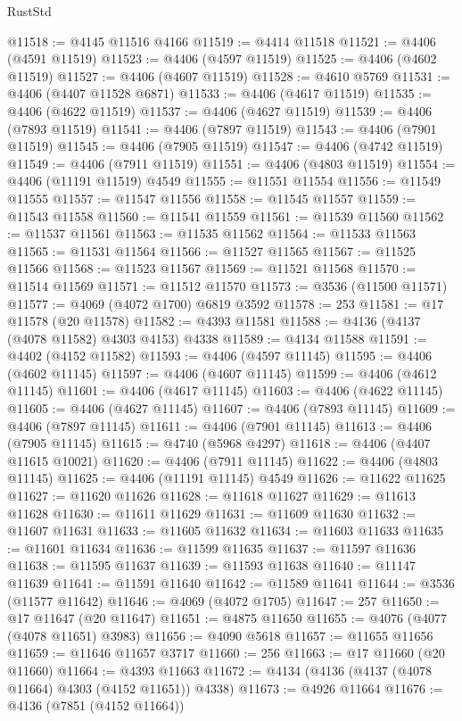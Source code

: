 \begin{lexlean}{RustStd}
\begin{coremodule}
{\begin{coremodule}
{{{{{{{{{{{{{{{{{{{{{{{{{{{{{{{{{{{{{{{{{{{{{{{{{{@11518 := @4145 @11516 @4166
@11519 := @4414 @11518
@11521 := @4406 (@4591 @11519)
@11523 := @4406 (@4597 @11519)
@11525 := @4406 (@4602 @11519)
@11527 := @4406 (@4607 @11519)
@11528 := @4610 @5769
@11531 := @4406 (@4407 @11528 @6871)
@11533 := @4406 (@4617 @11519)
@11535 := @4406 (@4622 @11519)
@11537 := @4406 (@4627 @11519)
@11539 := @4406 (@7893 @11519)
@11541 := @4406 (@7897 @11519)
@11543 := @4406 (@7901 @11519)
@11545 := @4406 (@7905 @11519)
@11547 := @4406 (@4742 @11519)
@11549 := @4406 (@7911 @11519)
@11551 := @4406 (@4803 @11519)
@11554 := @4406 (@11191 @11519) @4549
@11555 := @11551 @11554
@11556 := @11549 @11555
@11557 := @11547 @11556
@11558 := @11545 @11557
@11559 := @11543 @11558
@11560 := @11541 @11559
@11561 := @11539 @11560
@11562 := @11537 @11561
@11563 := @11535 @11562
@11564 := @11533 @11563
@11565 := @11531 @11564
@11566 := @11527 @11565
@11567 := @11525 @11566
@11568 := @11523 @11567
@11569 := @11521 @11568
@11570 := @11514 @11569
@11571 := @11512 @11570
@11573 := @3536 (@11500 @11571)
@11577 := @4069 (@4072 @1700) @6819 @3592
@11578 := 253
@11581 := @17 @11578 (@20 @11578)
@11582 := @4393 @11581
@11588 := @4136 (@4137 (@4078 @11582) @4303 @4153) @4338
@11589 := @4134 @11588
@11591 := @4402 (@4152 @11582)
@11593 := @4406 (@4597 @11145)
@11595 := @4406 (@4602 @11145)
@11597 := @4406 (@4607 @11145)
@11599 := @4406 (@4612 @11145)
@11601 := @4406 (@4617 @11145)
@11603 := @4406 (@4622 @11145)
@11605 := @4406 (@4627 @11145)
@11607 := @4406 (@7893 @11145)
@11609 := @4406 (@7897 @11145)
@11611 := @4406 (@7901 @11145)
@11613 := @4406 (@7905 @11145)
@11615 := @4740 (@5968 @4297)
@11618 := @4406 (@4407 @11615 @10021)
@11620 := @4406 (@7911 @11145)
@11622 := @4406 (@4803 @11145)
@11625 := @4406 (@11191 @11145) @4549
@11626 := @11622 @11625
@11627 := @11620 @11626
@11628 := @11618 @11627
@11629 := @11613 @11628
@11630 := @11611 @11629
@11631 := @11609 @11630
@11632 := @11607 @11631
@11633 := @11605 @11632
@11634 := @11603 @11633
@11635 := @11601 @11634
@11636 := @11599 @11635
@11637 := @11597 @11636
@11638 := @11595 @11637
@11639 := @11593 @11638
@11640 := @11147 @11639
@11641 := @11591 @11640
@11642 := @11589 @11641
@11644 := @3536 (@11577 @11642)
@11646 := @4069 (@4072 @1705)
@11647 := 257
@11650 := @17 @11647 (@20 @11647)
@11651 := @4875 @11650
@11655 := @4076 (@4077 (@4078 @11651) @3983)
@11656 := @4090 @5618
@11657 := @11655 @11656
@11659 := @11646 @11657 @3717
@11660 := 256
@11663 := @17 @11660 (@20 @11660)
@11664 := @4393 @11663
@11672 := @4134 (@4136 (@4137 (@4078 @11664) @4303 (@4152 @11651)) @4338)
@11673 := @4926 @11664
@11676 := @4136 (@7851 (@4152 @11664))
}}}}}}}}}}}}}}}}}}}}}}}}}}}}}}}}}}}}}}}}}}}}}}}}}}
\end{coremodule}}
\end{coremodule}
\end{lexlean}
